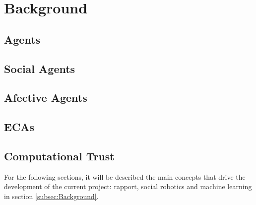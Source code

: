 \section{Background}
\label{sec:Background}




\subsection{Agents}

\subsection{Social Agents} %
\subsection{Afective Agents}
\subsection{ECAs}

\subsection{Computational Trust}

For the following sections, it will be described the main concepts that drive the development of the current project: rapport, social robotics and machine learning in section \ref{subsec:Background}.